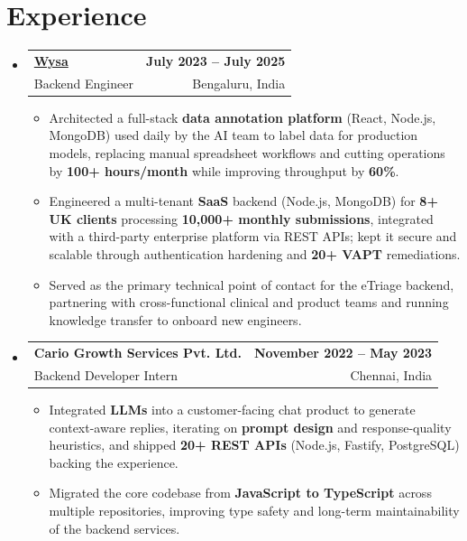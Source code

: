 \documentclass[letterpaper,10pt]{article}
\makeatletter
\newcommand{\resumeItem}[1]{
  \item\small{#1\vspace{-1pt}}
}
\newcommand{\resumeSubheading}[4]{
  \vspace{1pt}\item
    \begin{tabular*}{0.985\textwidth}[t]{l@{\extracolsep{\fill}}r}
      \textbf{#1} & \textbf{\small #2} \\
      {\small\color{ResumeSlate} #3} & {\small\color{ResumeSlate} #4} \\
    \end{tabular*}\vspace{-6pt}
}
\newcommand{\resumeSubHeadingListStart}{\begin{itemize}[leftmargin=0.0in, label={}, itemsep=2pt, topsep=2pt]}
\newcommand{\resumeSubHeadingListEnd}{\end{itemize}}
\newcommand{\resumeItemListStart}{\begin{itemize}[leftmargin=0.18in, itemsep=2pt, topsep=1pt]}
\newcommand{\resumeItemListEnd}{\end{itemize}\vspace{-4pt}}
\makeatother
\begin{document}
\section{Experience}
\resumeSubHeadingListStart
  \resumeSubheading
    {\href{https://www.wysa.io}{Wysa}}{July 2023 -- July 2025}
    {Backend Engineer}{Bengaluru, India}
    \resumeItemListStart
      \resumeItem{Architected a full-stack \textbf{data annotation platform} (React, Node.js, MongoDB) used daily by the AI team to label data for production models, replacing manual spreadsheet workflows and cutting operations by \textbf{100+ hours/month} while improving throughput by \textbf{60\%}.}
      \resumeItem{Engineered a multi-tenant \textbf{SaaS} backend (Node.js, MongoDB) for \textbf{8+ UK clients} processing \textbf{10{,}000+ monthly submissions}, integrated with a third-party enterprise platform via REST APIs; kept it secure and scalable through authentication hardening and \textbf{20+ VAPT} remediations.}
      \resumeItem{Served as the primary technical point of contact for the eTriage backend, partnering with cross-functional clinical and product teams and running knowledge transfer to onboard new engineers.}
    \resumeItemListEnd
  \resumeSubheading
    {Cario Growth Services Pvt. Ltd.}{November 2022 -- May 2023}
    {Backend Developer Intern}{Chennai, India}
    \resumeItemListStart
      \resumeItem{Integrated \textbf{LLMs} into a customer-facing chat product to generate context-aware replies, iterating on \textbf{prompt design} and response-quality heuristics, and shipped \textbf{20+ REST APIs} (Node.js, Fastify, PostgreSQL) backing the experience.}
      \resumeItem{Migrated the core codebase from \textbf{JavaScript to TypeScript} across multiple repositories, improving type safety and long-term maintainability of the backend services.}
    \resumeItemListEnd
\resumeSubHeadingListEnd
\vspace{-4pt}
\end{document}
